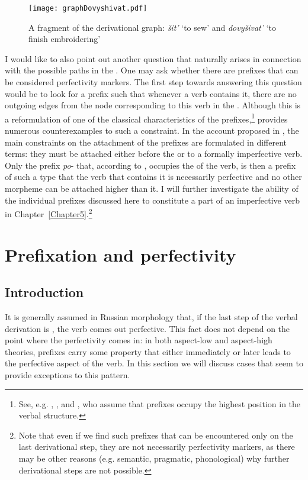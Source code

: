 \begin{figure}
\begin{center}
\texttt{[image: graphDovyshivat.pdf]}
\caption{A fragment of the derivational graph: \textit{\v{s}it'} `to sew' and \textit{dovy\v{s}ivat'} `to finish embroidering'\label{tree:dovyshivat}}
\end{center}
\end{figure}		

I would like to also point out another question that naturally arises in connection with the possible paths in the . One may ask whether there are prefixes that can be considered perfectivity markers. The first step towards answering this question would be to look for a prefix such that whenever a verb contains it, there are no outgoing edges from the node corresponding to this verb in the . Although this is a reformulation of one of the classical characteristics of the  prefixes,\footnote{See, e.g. \citet{Ramchand:04}, \citet{Svenonius:04a}, and \citet{Romanova:06}, who assume that  prefixes occupy the highest position in the verbal structure.} \citet{Tatevosov:07, Tatevosov:09} provides numerous counterexamples to such a constraint. In the account proposed in \citealt{Tatevosov:09}, the main constraints on the attachment of the  prefixes are formulated in different terms: they must be attached either before the  or to a formally imperfective verb. Only the  prefix \textit{po}- that, according to \citet{Tatevosov:09}, occupies the  of the verb, is then a prefix of such a type that the verb that contains it is necessarily perfective and no other morpheme can be attached higher than it. I will further investigate the ability of the individual prefixes discussed here to constitute a part of an imperfective verb in Chapter~\ref{Chapter5}.\footnote{Note that even if we find such prefixes that can be encountered only on the last derivational step, they are not necessarily perfectivity markers, as there may be other reasons (e.g. semantic, pragmatic, phonological) why further derivational steps are not possible.}

\section{Prefixation and perfectivity}\label{section:new:perfectivity}

\subsection{Introduction}
It is generally assumed in Russian morphology that, if the last step of the verbal derivation is , the verb comes out perfective. This fact does not depend on the point where the perfectivity comes in: in both aspect-low \citep[][among others]{Verkuyl:95, Pinon:01, Ramchand:04} and aspect-high \citep{Paslawska:03, Gronn:10, Tatevosov:11} theories, prefixes carry some property that either immediately or later leads to the perfective aspect of the verb. In this section we will discuss cases that seem to provide exceptions to this pattern.

